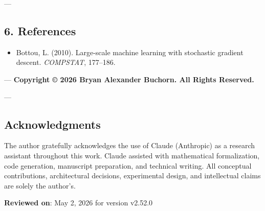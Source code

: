 ---

\subsection{6. References}

\begin{itemize}
\item [bottou\-2010\-large] Bottou, L. (2010). Large-scale machine learning with stochastic gradient descent. \textit{COMPSTAT}, 177–186.

\end{itemize}
---
\textbf{Copyright © 2026 Bryan Alexander Buchorn. All Rights Reserved.}

---
\subsection{Acknow\-ledgments}

The author gratefully ackno\-wledges the use of Claude (Anthropic) as a research assistant throughout this work. Claude assisted with mathe\-matical forma\-lization, code generation, manuscript preparation, and technical writing. All conceptual contr\-ibutions, archi\-tectural decisions, exper\-imental design, and intel\-lectual claims are solely the author's.

\textbf{Reviewed on}: May 2, 2026 for version v2.52.0
